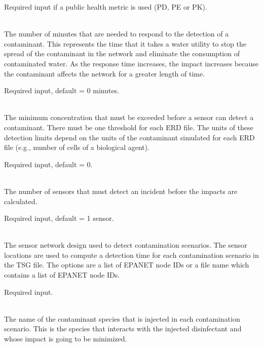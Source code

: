 \begin{description}[topsep=0pt,parsep=0.5em,itemsep=-0.4em]
\begin{description}[topsep=0pt,parsep=0.5em,itemsep=-0.4em]
                Required input if a public health metric is used (PD, PE or PK).
    \item[{response time}]\hfill
\\The number of minutes that are needed to respond to the
                detection of a contaminant. This represents the time that it takes
                a water utility to stop the spread of the contaminant in the network and 
                eliminate the consumption of contaminated water. As the response time increases,
                the impact increases because the contaminant affects the network
                for a greater length of time.  
                
                Required input, default = 0 minutes.
    \item[{detection limit}]\hfill
\\The minimum concentration that must be exceeded before a sensor can detect a contaminant.
                There must be one threshold for each ERD file. The units of
                these detection limits depend on the units of the contaminant
                simulated for each ERD file (e.g., number of cells of a
                biological agent).  
                
                Required input, default = 0.
    \item[{detection confidence}]\hfill
\\The number of sensors that must detect an incident before
                the impacts are calculated.  
                
                Required input, default = 1 sensor.
  \end{description}
  \item[{booster msx}]\hfill
  \begin{description}[topsep=0pt,parsep=0.5em,itemsep=-0.4em]
    \item[{detection}]\hfill
\\The sensor network design used to detect contamination scenarios. The
                sensor locations are used to compute a detection time for each 
                contamination scenario in the TSG file. The options are a list of 
                EPANET node IDs or a file name which contains a list of EPANET node IDs.
                
                Required input.
    \item[{toxin species}]\hfill
\\The name of the contaminant species that is injected in each
                contamination scenario. This is the species that interacts with the 
                injected disinfectant and whose impact is going to be minimized.
                

\end{description}
\end{description}
